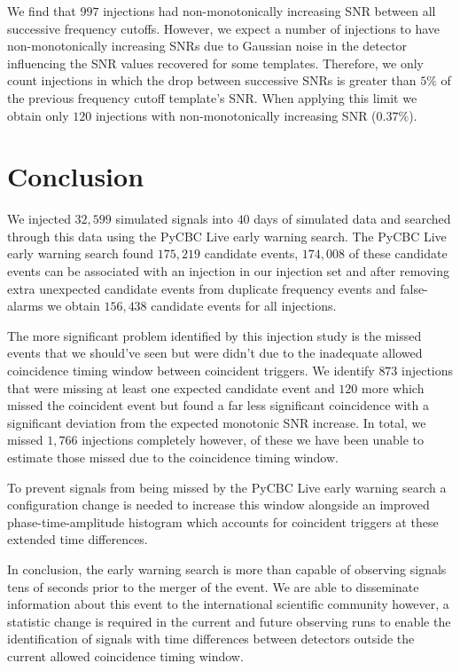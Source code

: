 We find that $997$ injections had non-monotonically increasing SNR between all successive frequency cutoffs. However, we expect a number of injections to have non-monotonically increasing SNRs due to Gaussian noise in the detector influencing the SNR values recovered for some templates. Therefore, we only count injections in which the drop between successive SNRs is greater than $5\%$ of the previous frequency cutoff template's SNR. When applying this limit we obtain only $120$ injections with non-monotonically increasing SNR ($0.37\%$).


\section{\label{6:sec:conclusion}Conclusion}

We injected $32,599$ simulated \gwadj signals into $40$ days of simulated \gwadj data and searched through this data using the PyCBC Live early warning search. The PyCBC Live early warning search found $175,219$ candidate events, $174,008$ of these candidate events can be associated with an injection in our injection set and after removing extra unexpected candidate events from duplicate frequency events and false-alarms we obtain $156,438$ candidate events for all injections.

The more significant problem identified by this injection study is the missed events that we should've seen but were didn't due to the inadequate allowed coincidence timing window between coincident triggers. We identify $873$ injections that were missing at least one expected candidate event and $120$ more which missed the coincident event but found a far less significant coincidence with a significant deviation from the expected monotonic SNR increase. In total, we missed $1,766$ injections completely however, of these we have been unable to estimate those missed due to the coincidence timing window.

To prevent \gwadj signals from being missed by the PyCBC Live early warning search a configuration change is needed to increase this window alongside an improved phase-time-amplitude histogram which accounts for coincident \gwadj triggers at these extended time differences. 

In conclusion, the early warning search is more than capable of observing \gwadj signals tens of seconds prior to the merger of the \gwadj event. We are able to disseminate information about this event to the international scientific community however, a statistic change is required in the current and future observing runs to enable the identification of \gwadj signals with time differences between detectors outside the current allowed coincidence timing window.
